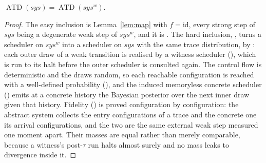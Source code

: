 \begin{theorem}
  \label{thm:weakclosure-eq}
  \leanok
  $\operatorname{ATD}(sys) = \operatorname{ATD}(sys^w)$.
\end{theorem}

\begin{proof}\leanok
  The easy inclusion is Lemma~\ref{lem:map} with $f = \mathrm{id}$, every strong step of $sys$ being a degenerate weak step of $sys^w$, and it is .
  The hard inclusion, , turns a scheduler on $sys^w$ into a scheduler on $sys$ with the same trace distribution, by : each outer draw of a weak transition is realised by a witness scheduler (), which is run to its halt before the outer scheduler is consulted again.
  The control flow is deterministic and the draws random, so each reachable configuration is reached with a well-defined probability (), and the induced memoryless concrete scheduler () emits at a concrete history the Bayesian posterior over the next inner draw given that history.
  Fidelity () is proved configuration by configuration: the abstract system collects the entry configurations of a trace and the concrete one its arrival configurations, and the two are the same external weak step measured one moment apart.
  Their masses are equal rather than merely comparable, because a witness's post-$\tau$ run halts almost surely and no mass leaks to divergence inside it.
\end{proof}
